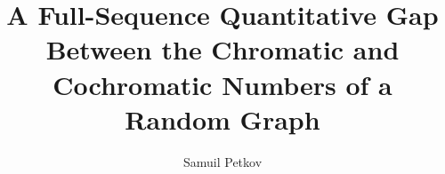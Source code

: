 \documentclass[11pt,reqno]{amsart}
\title[Chromatic and cochromatic numbers]{A Full-Sequence Quantitative Gap
Between the Chromatic and Cochromatic Numbers of a Random Graph}
\author[Samuil Petkov]{Samuil Petkov}
\begin{document}








\renewcommand{\bibsection}{\section*{References}}


\end{document}

